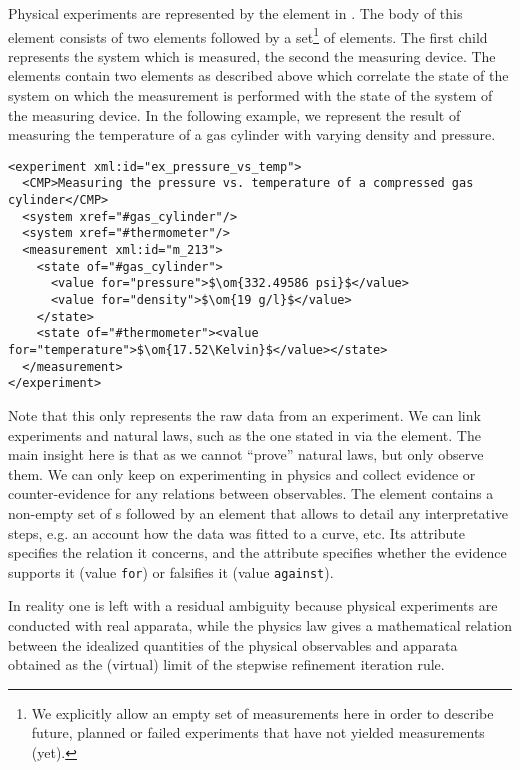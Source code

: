 Physical experiments are represented by the {} element in
{\physml}. The body of this element consists of  two {} elements followed by a
set\footnote{We explicitly allow an empty set of measurements here in order to describe
  future, planned or failed experiments that have not yielded measurements (yet).} of
{} elements. The first child represents the system which is measured,
the second the measuring device. The {} elements contain two
{} elements as described above which correlate the state of the system on
which the measurement is performed with the state of the system of the measuring
device. In the following example, we represent the result of measuring the temperature of
a gas cylinder with varying density and pressure.  
\begin{lstlisting}[label=lst:experiment,caption={Experiment: measuring the temp.
    of a gas cylinder},
  index={state,value},mathescape]
<experiment xml:id="ex_pressure_vs_temp">
  <CMP>Measuring the pressure vs. temperature of a compressed gas cylinder</CMP>
  <system xref="#gas_cylinder"/>
  <system xref="#thermometer"/>
  <measurement xml:id="m_213">
    <state of="#gas_cylinder">
      <value for="pressure">$\om{332.49586 psi}$</value>
      <value for="density">$\om{19 g/l}$</value>
    </state>
    <state of="#thermometer"><value for="temperature">$\om{17.52\Kelvin}$</value></state>
  </measurement>
</experiment>
\end{lstlisting}
Note that this only represents the raw data from an experiment. We can link experiments
and natural laws, such as the one stated in {} via the
{} element. The main insight here is that as we cannot ``prove'' natural
laws, but only observe them. We can only keep on experimenting in physics and collect
evidence or counter-evidence for any relations between observables. The {}
element contains a non-empty set of {}s followed by an
{} element that allows to detail any interpretative steps, e.g. an
account how the data was fitted to a curve, etc. Its {} attribute
specifies the relation it concerns, and the {} attribute
specifies whether the evidence supports it (value {\tt{for}}) or falsifies it (value
{\tt{against}}).

In reality one is left with a residual ambiguity because physical experiments are
conducted with real apparata, while the physics law gives a mathematical relation between
the idealized quantities of the physical observables and apparata obtained as the
(virtual) limit of the stepwise refinement iteration rule.


